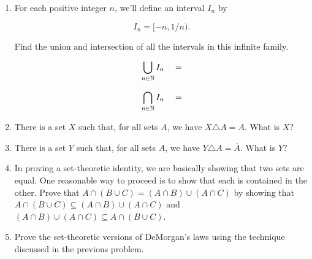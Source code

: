 \begin{enumerate}
\item For each positive integer $n$, we'll define an interval $I_n$
by

\[ I_n = [-n, 1/n). \]

Find the union and intersection of all the intervals in this infinite family.

\[ \bigcup_{n \in {\mathbb N}} I_n \quad = \]

\[ \bigcap_{n \in {\mathbb N}} I_n \quad = \]

\item There is a set $X$ such that, for all sets $A$, we have 
$X \triangle A = A$.  What is $X$?

\item There is a set $Y$ such that, for all sets $A$, we have 
$Y \triangle A = \overline{A}$.  What is $Y$?

\item In proving a set-theoretic identity, we are basically showing that
two sets are equal.  One reasonable way to proceed is to show that
each is contained in the other.  Prove that 
$A \cap (B \cup C) = (A \cap B) \cup (A \cap C)$ by showing that 
$A \cap (B \cup C) \subseteq (A \cap B) \cup (A \cap C)$ and 
$(A \cap B) \cup (A \cap C) \subseteq A \cap (B \cup C)$.

\item Prove the set-theoretic versions of DeMorgan's laws using the technique
discussed in the previous problem.

\end{enumerate}



